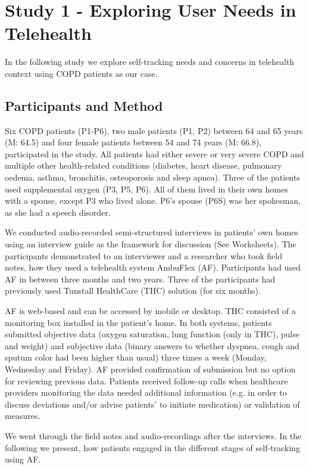 \section{Study 1 - Exploring User Needs in Telehealth}
In the following study we explore self-tracking needs and concerns in telehealth context using COPD patients as our case. 

\subsection{Participants and Method} 
Six COPD patients (P1-P6), two male patients (P1, P2) between 64 and 65 years (M: 64.5) and four female patients between 54 and 74 years (M: 66.8), participated in the study. All patients had either severe or very severe COPD and multiple other health-related conditions (diabetes, heart disease, pulmonary oedema, asthma, bronchitis, osteoporosis and sleep apnea). Three of the patients used supplemental oxygen (P3, P5, P6). All of them lived in their own homes with a spouse, except P3 who lived alone. P6’s spouse (P6S) was her spokesman, as she had a speech disorder. 

We conducted audio-recorded semi-structured interviews in patients’ own homes using an interview guide as the framework for discussion (See Worksheets). The participants demonstrated to an interviewer and a researcher who took field notes, how they used a telehealth system AmbuFlex (AF). Participants had used AF in between three months and two years. Three of the participants had previously used Tunstall HealthCare (THC) solution (for six months). 

AF is web-based and can be accessed by mobile or desktop. THC consisted of a monitoring box installed in the patient’s home. In both systems, patients submitted objective data (oxygen saturation, lung function (only in THC), pulse and weight) and subjective data (binary answers to whether dyspnea, cough and sputum color had been higher than usual) three times a week (Monday, Wednesday and Friday). AF provided confirmation of submission but no option for reviewing previous data. Patients received follow-up calls when healthcare providers monitoring the data needed additional information (e.g. in order to discuss deviations and/or advise patients’ to initiate medication) or validation of measures. 

We went through the field notes and audio-recordings after the interviews. In the following we present, how patients engaged in the different stages of self-tracking using AF. 

